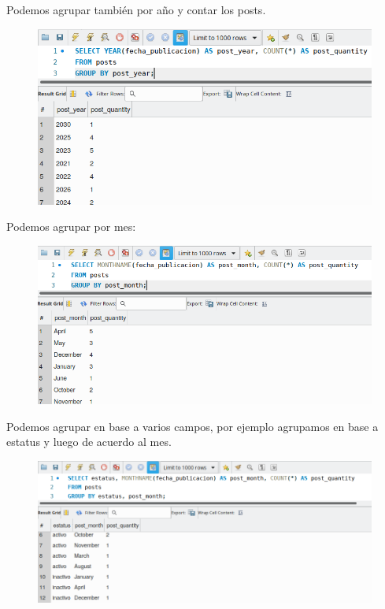 \documentclass{article}
\begin{document}
Podemos agrupar también por año y contar los posts.\\
\begin{figure}[h!]
  \centering
  \includegraphics[scale=0.75]{./Pictures/119_group_by_year.png}
\end{figure}

Podemos agrupar por mes:\\
\begin{figure}[h!]
  \centering
  \includegraphics[scale=0.75]{./Pictures/120_group_by_monthname.png}
\end{figure}

Podemos agrupar en base a varios campos, por ejemplo agrupamos en base a
estatus y luego de acuerdo al mes.
\begin{figure}[h!]
  \centering
  \includegraphics[scale=0.75]{./Pictures/121_group_by_estatus_month.png}
\end{figure}
\end{document}

